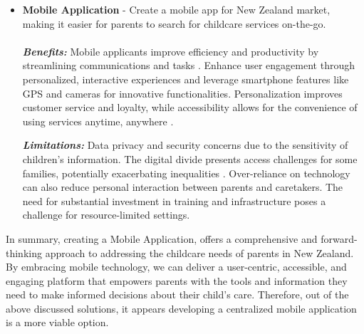 \begin{itemize}
    \item \textbf{Mobile Application} - Create a mobile app for New Zealand market, making it easier for parents to search for childcare services on-the-go.\\ \\
    \emph{\textbf{Benefits:}} Mobile applicants improve efficiency and productivity by streamlining communications and tasks \cite{sarwar2013impact}. Enhance user engagement through personalized, interactive experiences and leverage smartphone features like GPS and cameras for innovative functionalities. Personalization improves customer service and loyalty, while accessibility allows for the convenience of using services anytime, anywhere \cite{shaikh2015mobile}.
    
    \emph{\textbf{Limitations:}} Data privacy and security concerns due to the sensitivity of children's information.\cite{privacyact2020} The digital divide presents access challenges for some families, potentially exacerbating inequalities \cite{di2020likely}. Over-reliance on technology can also reduce personal interaction between parents and caretakers. The need for substantial investment in training and infrastructure poses a challenge for resource-limited settings.
\end{itemize}


In summary, creating a Mobile Application, offers a comprehensive and forward-thinking approach to addressing the childcare needs of parents in New Zealand. By embracing mobile technology, we can deliver a user-centric, accessible, and engaging platform that empowers parents with the tools and information they need to make informed decisions about their child's care. Therefore, out of the above discussed solutions, it appears developing a centralized mobile application is a more viable option. \par
